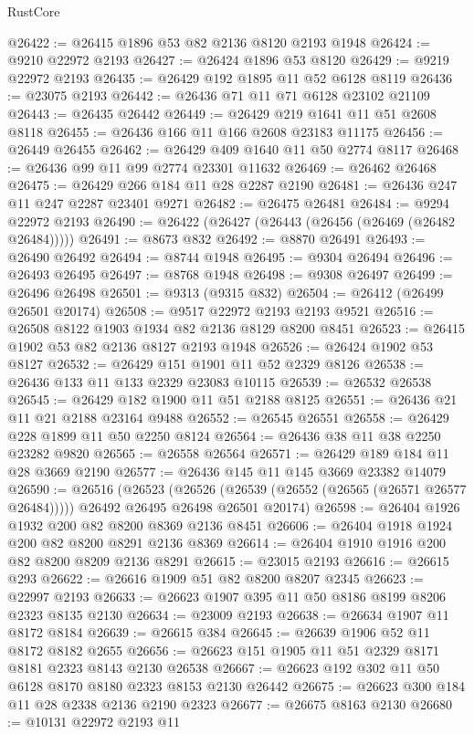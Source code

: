 \begin{lexlean}{RustCore}
\begin{coremodule}
@26422 := @26415 @1896 @53 @82 @2136 @8120 @2193 @1948
@26424 := @9210 @22972 @2193
@26427 := @26424 @1896 @53 @8120
@26429 := @9219 @22972 @2193
@26435 := @26429 @192 @1895 @11 @52 @6128 @8119
@26436 := @23075 @2193
@26442 := @26436 @71 @11 @71 @6128 @23102 @21109
@26443 := @26435 @26442
@26449 := @26429 @219 @1641 @11 @51 @2608 @8118
@26455 := @26436 @166 @11 @166 @2608 @23183 @11175
@26456 := @26449 @26455
@26462 := @26429 @409 @1640 @11 @50 @2774 @8117
@26468 := @26436 @99 @11 @99 @2774 @23301 @11632
@26469 := @26462 @26468
@26475 := @26429 @266 @184 @11 @28 @2287 @2190
@26481 := @26436 @247 @11 @247 @2287 @23401 @9271
@26482 := @26475 @26481
@26484 := @9294 @22972 @2193
@26490 := @26422 (@26427 (@26443 (@26456 (@26469 (@26482 @26484)))))
@26491 := @8673 @832
@26492 := @8870 @26491
@26493 := @26490 @26492
@26494 := @8744 @1948
@26495 := @9304 @26494
@26496 := @26493 @26495
@26497 := @8768 @1948
@26498 := @9308 @26497
@26499 := @26496 @26498
@26501 := @9313 (@9315 @832)
@26504 := @26412 (@26499 @26501 @20174)
@26508 := @9517 @22972 @2193 @2193 @9521
@26516 := @26508 @8122 @1903 @1934 @82 @2136 @8129 @8200 @8451
@26523 := @26415 @1902 @53 @82 @2136 @8127 @2193 @1948
@26526 := @26424 @1902 @53 @8127
@26532 := @26429 @151 @1901 @11 @52 @2329 @8126
@26538 := @26436 @133 @11 @133 @2329 @23083 @10115
@26539 := @26532 @26538
@26545 := @26429 @182 @1900 @11 @51 @2188 @8125
@26551 := @26436 @21 @11 @21 @2188 @23164 @9488
@26552 := @26545 @26551
@26558 := @26429 @228 @1899 @11 @50 @2250 @8124
@26564 := @26436 @38 @11 @38 @2250 @23282 @9820
@26565 := @26558 @26564
@26571 := @26429 @189 @184 @11 @28 @3669 @2190
@26577 := @26436 @145 @11 @145 @3669 @23382 @14079
@26590 := @26516
    (@26523
      (@26526 (@26539 (@26552 (@26565 (@26571 @26577 @26484)))))
      @26492
      @26495
      @26498
      @26501
      @20174)
@26598 := @26404 @1926 @1932 @200 @82 @8200 @8369 @2136 @8451
@26606 := @26404 @1918 @1924 @200 @82 @8200 @8291 @2136 @8369
@26614 := @26404 @1910 @1916 @200 @82 @8200 @8209 @2136 @8291
@26615 := @23015 @2193
@26616 := @26615 @293
@26622 := @26616 @1909 @51 @82 @8200 @8207 @2345
@26623 := @22997 @2193
@26633 := @26623 @1907 @395 @11 @50 @8186 @8199 @8206 @2323 @8135 @2130
@26634 := @23009 @2193
@26638 := @26634 @1907 @11 @8172 @8184
@26639 := @26615 @384
@26645 := @26639 @1906 @52 @11 @8172 @8182 @2655
@26656 := @26623 @151 @1905 @11 @51 @2329 @8171 @8181 @2323 @8143 @2130 @26538
@26667 := @26623 @192 @302 @11 @50 @6128 @8170 @8180 @2323 @8153 @2130 @26442
@26675 := @26623 @300 @184 @11 @28 @2338 @2136 @2190 @2323
@26677 := @26675 @8163 @2130
@26680 := @10131 @22972 @2193 @11

\end{coremodule}
\end{lexlean}
